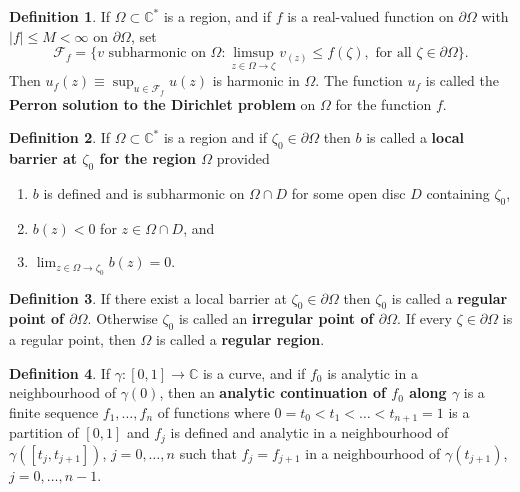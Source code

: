 \documentclass[12pt]{article}
\theoremstyle{definition}
\newtheorem{definition}{Definition}
\newcommand{\C}{\mathbb{C}}    %
\begin{document}
\begin{definition}
    If $\Omega\subset\C^*$ is a region, and if $f$ is a real-valued function on $\partial\Omega$ with $|f|\leq M<\infty$ on $\partial \Omega$, set
    \begin{equation*}
        \mathcal{F}_f=\{v \text{ subharmonic on } \Omega : \limsup_{z\in\Omega\to\zeta} v_(z)\leq f(\zeta),\text{ for all }\zeta\in\partial\Omega\}.
    \end{equation*}
    Then $u_f(z)\equiv\sup_{u\in\mathcal{F}_f} u(z)$ is harmonic in $\Omega$. The function $u_f$ is called the \textbf{Perron solution to the Dirichlet problem} on $\Omega$ for the function $f$.
\end{definition}
\newpage
\begin{definition}
    If $\Omega\subset \C^*$ is a region and if $\zeta_0\in\partial\Omega$ then $b$ is called a \textbf{local barrier at $\zeta_0$ for the region $\Omega$} provided
    \begin{enumerate}[label=(\roman*)]
        \item $b$ is defined and is subharmonic on $\Omega\cap D$ for some open disc $D$ containing $\zeta_0$,
        \item $b(z)<0$ for $z\in\Omega\cap D$, and
        \item $\lim_{z\in\Omega\to\zeta_0} b(z)=0$.
    \end{enumerate}
\end{definition}

\begin{definition}
    If there exist a local barrier at $\zeta_0\in\partial \Omega$ then $\zeta_0$ is called a \textbf{regular point of $\partial\Omega$}. Otherwise $\zeta_0$ is called an \textbf{irregular point of $\partial\Omega$}. If every $\zeta\in\partial\Omega$ is a regular point, then $\Omega$ is called a \textbf{regular region}.
\end{definition}

\begin{definition}
    If $\gamma:[0,1]\to\C$ is a curve, and if $f_0$ is analytic in a neighbourhood of $\gamma(0)$, then an \textbf{analytic continuation of $f_0$ along $\gamma$} is a finite sequence $f_1,\dots, f_n$ of functions where $0=t_0<t_1<\dots<t_{n+1}=1$ is a partition of $[0,1]$ and $f_j$ is defined and analytic in a neighbourhood of $\gamma([t_j,t_{j+1}])$, $j=0,\dots,n$ such that $f_j=f_{j+1}$ in a neighbourhood of $\gamma(t_{j+1})$, $j=0,\dots,n-1$.
\end{definition}
\end{document}
